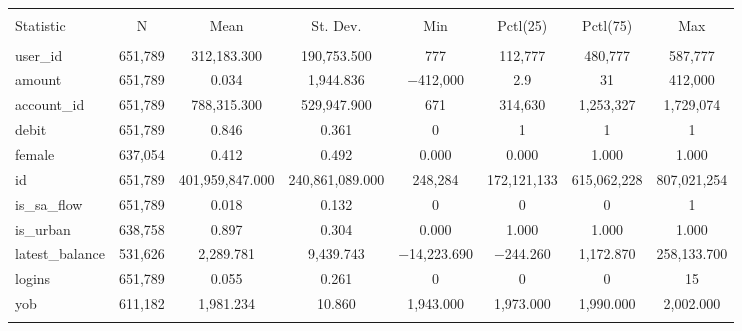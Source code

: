 
\begin{table}[!htbp] \centering 
  \caption{} 
  \label{} 
\begin{tabular}{@{\extracolsep{5pt}}lccccccc} 
\\[-1.8ex]\hline 
\hline \\[-1.8ex] 
Statistic & \multicolumn{1}{c}{N} & \multicolumn{1}{c}{Mean} & \multicolumn{1}{c}{St. Dev.} & \multicolumn{1}{c}{Min} & \multicolumn{1}{c}{Pctl(25)} & \multicolumn{1}{c}{Pctl(75)} & \multicolumn{1}{c}{Max} \\ 
\hline \\[-1.8ex] 
user\_id & 651,789 & 312,183.300 & 190,753.500 & 777 & 112,777 & 480,777 & 587,777 \\ 
amount & 651,789 & 0.034 & 1,944.836 & $-$412,000 & 2.9 & 31 & 412,000 \\ 
account\_id & 651,789 & 788,315.300 & 529,947.900 & 671 & 314,630 & 1,253,327 & 1,729,074 \\ 
debit & 651,789 & 0.846 & 0.361 & 0 & 1 & 1 & 1 \\ 
female & 637,054 & 0.412 & 0.492 & 0.000 & 0.000 & 1.000 & 1.000 \\ 
id & 651,789 & 401,959,847.000 & 240,861,089.000 & 248,284 & 172,121,133 & 615,062,228 & 807,021,254 \\ 
is\_sa\_flow & 651,789 & 0.018 & 0.132 & 0 & 0 & 0 & 1 \\ 
is\_urban & 638,758 & 0.897 & 0.304 & 0.000 & 1.000 & 1.000 & 1.000 \\ 
latest\_balance & 531,626 & 2,289.781 & 9,439.743 & $-$14,223.690 & $-$244.260 & 1,172.870 & 258,133.700 \\ 
logins & 651,789 & 0.055 & 0.261 & 0 & 0 & 0 & 15 \\ 
yob & 611,182 & 1,981.234 & 10.860 & 1,943.000 & 1,973.000 & 1,990.000 & 2,002.000 \\ 
\hline \\[-1.8ex] 
\end{tabular} 
\end{table} 
